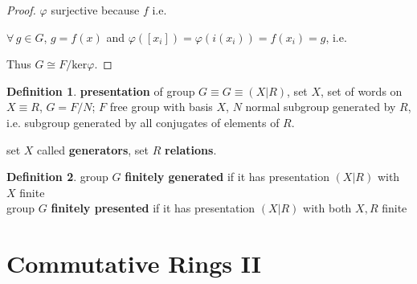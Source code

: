 \documentclass[twoside,landscape]{amsart}
\theoremstyle{plain}
\theoremstyle{definition}
\newtheorem{definition}{Definition}
\theoremstyle{remark}
\begin{document}
\begin{multicols*}{2}
\begin{proof}


$\varphi$ surjective because $f$ i.e. 

$\forall \, g \in G$, $g=f(x)$ and $\varphi([x_i]) = \varphi(i(x_i)) = f(x_i)=g$, i.e.

Thus $G \cong F/\text{ker}\varphi$.  

\end{proof}


\begin{definition}
  \textbf{presentation} of group $G \equiv G \equiv (X|R)$, set $X$, set of words on $X \equiv R$, $G=F/N$; $F$ free group with basis $X$, $N$ normal subgroup generated by $R$, i.e. subgroup generated by all conjugates of elements of $R$.  

set $X$ called \textbf{generators}, set $R$ \textbf{relations}.   
\end{definition}


\begin{definition}
  group $G$ \textbf{finitely generated} if it has presentation $(X|R)$ with $X$ finite \\
  group $G$ \textbf{finitely presented} if it has presentation $(X|R)$ with both $X,R$ finite
\end{definition}



\section{ Commutative Rings II }




\end{multicols*}
\end{document}
